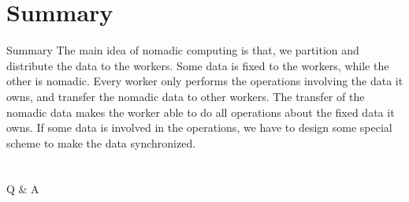 \documentclass{beamer}
\begin{document}
  \section{Summary}
  \begin{frame}{Summary}
    The main idea of nomadic computing is that, we partition and distribute the data to the workers. Some data is fixed to the workers, while the other is nomadic. Every worker only performs the operations involving the data it owns, and transfer the nomadic data to other workers. The transfer of the nomadic data makes the worker able to do all operations about the fixed data it owns. If some data is involved in the operations, we have to design some special scheme to make the data synchronized.
  \end{frame}

  \section{}
  \begin{frame}{Q \& A}

  \end{frame}
\end{document}
